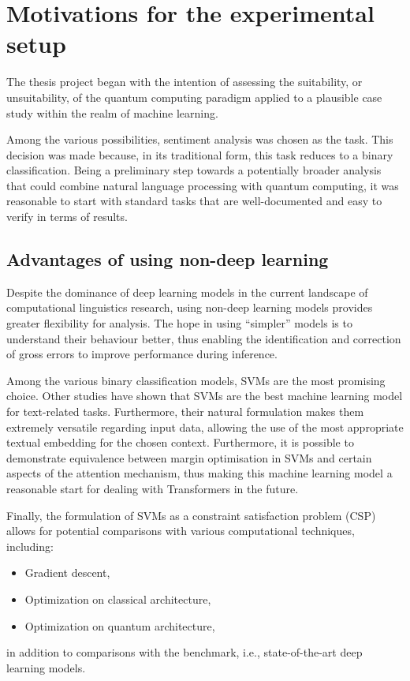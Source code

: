 \chapter{Motivations for the experimental setup}

The thesis project began with the intention of assessing the suitability, or unsuitability, of the quantum computing paradigm applied to a plausible case study within the realm of machine learning.

Among the various possibilities, sentiment analysis was chosen as the task. This decision was made because, in its traditional form, this task reduces to a binary classification. Being a preliminary step towards a potentially broader analysis that could combine natural language processing with quantum computing, it was reasonable to start with standard tasks that are well-documented and easy to verify in terms of results.

\section{Advantages of using non-deep learning}\label{sec:qadvantages}

Despite the dominance of deep learning models in the current landscape of computational linguistics research, using non-deep learning models provides greater flexibility for analysis. The hope in using ``simpler'' models is to understand their behaviour better, thus enabling the identification and correction of gross errors to improve performance during inference.

Among the various binary classification models, SVMs are the most promising choice. Other studies have shown that SVMs are the best machine learning model for text-related tasks\cite{ML4NLP}. Furthermore, their natural formulation makes them extremely versatile regarding input data, allowing the use of the most appropriate textual embedding for the chosen context. Furthermore, it is possible to demonstrate equivalence between margin optimisation in SVMs and certain aspects of the attention mechanism\cite{TransformerSVM}, thus making this machine learning model a reasonable start for dealing with Transformers in the future.

Finally, the formulation of SVMs as a constraint satisfaction problem (CSP) allows for potential comparisons with various computational techniques, including:

\begin{itemize}
    \item Gradient descent,
	\item Optimization on classical architecture,
	\item Optimization on quantum architecture,
\end{itemize}
in addition to comparisons with the benchmark, i.e.,  state-of-the-art deep learning models.

